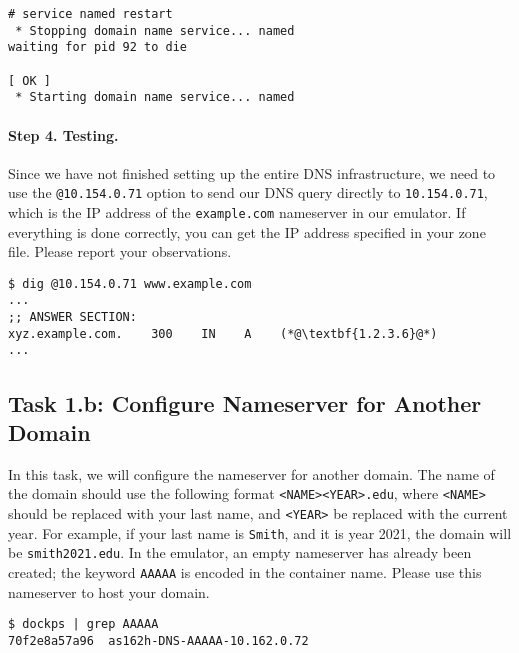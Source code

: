 \begin{lstlisting}
# service named restart
 * Stopping domain name service... named                                                                 waiting for pid 92 to die
                                                                                                  [ OK ]
 * Starting domain name service... named
\end{lstlisting}


\paragraph{Step 4. Testing.} 
Since we have not finished setting up the entire 
DNS infrastructure, we need to 
use the \texttt{@10.154.0.71} option to send our DNS query
directly to \texttt{10.154.0.71}, which is the IP
address of the \texttt{example.com} nameserver in our emulator.
If everything is done correctly, you can get the IP address specified
in your zone file. Please report your observations.

\begin{lstlisting}
$ dig @10.154.0.71 www.example.com
... 
;; ANSWER SECTION:
xyz.example.com.    300    IN    A    (*@\textbf{1.2.3.6}@*)
...
\end{lstlisting}




\subsection{Task 1.b: Configure Nameserver for Another Domain} 


In this task, we will configure the nameserver for another domain.
The name of the domain should use the following 
format \texttt{<NAME><YEAR>.edu}, where \texttt{<NAME>} should be 
replaced with your last name, and \texttt{<YEAR>} be replaced 
with the current year. 
For example, if your last name is \texttt{Smith}, and 
it is year 2021, the domain will be \texttt{smith2021.edu}.  
In the emulator, an empty nameserver has already been created;
the keyword \texttt{AAAAA} is encoded in the container name. Please 
use this nameserver to host your domain. 

\begin{lstlisting}
$ dockps | grep AAAAA
70f2e8a57a96  as162h-DNS-AAAAA-10.162.0.72
\end{lstlisting}




